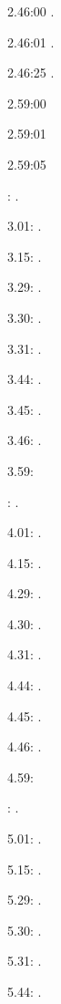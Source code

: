 \label{key}\documentclass[italian]{article}
\begin{document}
2.46:00   .

2.46:01   .

2.46:25   .

2.59:00   

2.59:01   

2.59:05   

:  .

3.01:   . 

3.15:   . 

3.29:   . 

3.30:   .

3.31:   .

3.44:   .

3.45:   .

3.46:   .

3.59:   

:  .

4.01:   . 

4.15:   . 

4.29:   . 

4.30:   .

4.31:   .

4.44:   .

4.45:   .

4.46:   .

4.59:   

:  .

5.01:   . 

5.15:   . 

5.29:   . 

5.30:   .

5.31:   .

5.44:   .
\end{document}
